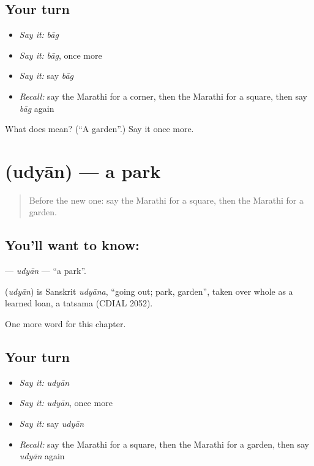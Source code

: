 \subsection*{Your turn}
\begin{itemize}
\raggedright
  \item \emph{Say it:} \emph{bāg}
  \item \emph{Say it:} \emph{bāg}, once more
  \item \emph{Say it:} say \emph{bāg}
  \item \emph{Recall:} say the Marathi for a corner, then the Marathi for a square, then say \emph{bāg} again
\end{itemize}

\begin{tcolorbox}[breakable,colback=teal!4,colframe=teal!35!black,title={Before you move on}]
What does  mean? (\textquotedblleft{}A garden\textquotedblright{}.) Say it once more.
\end{tcolorbox}
\section[\texorpdfstring{\mr{उद्यान} (udyān)}{उद्यान (udyān)}]{ (udyān) — a park}

\label{lesson:MR-C128-udyan}



\begin{quote}
Before the new one: say the Marathi for a square, then the Marathi for a garden.
\end{quote}

\subsection*{You'll want to know: }
\textbf{} — \emph{udyān} — \textquotedblleft{}a park\textquotedblright{}.

\begin{cousinweb}
\textbf{} (\emph{udyān}) is Sanskrit \emph{udyāna}, \textquotedblleft{}going out; park, garden\textquotedblright{}, taken over whole as a learned loan, a tatsama (CDIAL 2052).
\end{cousinweb}

\begin{grammarlens}[title={What you've built}]
One more word for this chapter.
\end{grammarlens}

\subsection*{Your turn}
\begin{itemize}
\raggedright
  \item \emph{Say it:} \emph{udyān}
  \item \emph{Say it:} \emph{udyān}, once more
  \item \emph{Say it:} say \emph{udyān}
  \item \emph{Recall:} say the Marathi for a square, then the Marathi for a garden, then say \emph{udyān} again
\end{itemize}

